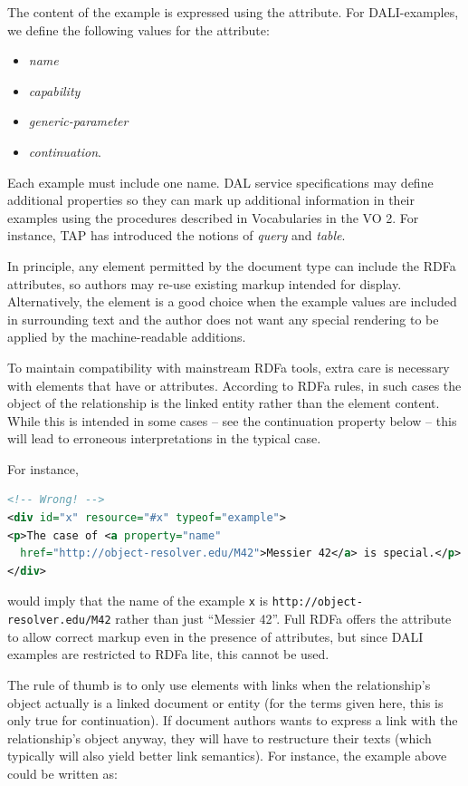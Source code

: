 \documentclass[11pt,letter]{ivoa}
\begin{document}
The content of the example is expressed using the  attribute. For
DALI-examples, we define the following values for the  attribute:

\begin{itemize}
\item \emph{name}
\item \emph{capability}
\item \emph{generic-parameter}
\item \emph{continuation}.
\end{itemize}

Each example must include one
name.  DAL service specifications may define additional
properties so they can mark up additional information in their examples
using the procedures described in Vocabularies in the VO 2.  For
instance, TAP has introduced the notions of \emph{query} and \emph{table}.

In principle, any element permitted by the document type can include the RDFa
attributes, so authors may re-use existing markup intended for display.
Alternatively, the  element is a good choice when the example values are
included in surrounding text and the author does not want any special rendering
to be applied by the machine-readable additions.

To maintain compatibility with mainstream RDFa tools, extra care is
necessary with elements that have  or 
attributes.  According to RDFa rules, in such cases the object of the
relationship is the linked entity rather than the element content.
While this is intended in some cases -- see the continuation property
below -- this will lead to erroneous interpretations in the typical
case.

For instance,

\begin{lstlisting}[language=XML]
<!-- Wrong! -->
<div id="x" resource="#x" typeof="example">
<p>The case of <a property="name"
  href="http://object-resolver.edu/M42">Messier 42</a> is special.</p>
</div>
\end{lstlisting}

\noindent
would imply that the name of the example \texttt{x} is
\nolinkurl{http://object-resolver.edu/M42} rather than just ``Messier
42''.  Full RDFa offers the  attribute to allow correct
markup even in the presence of  attributes, but since DALI
examples are restricted to RDFa lite, this cannot be used.

The rule of thumb is to only use elements with links when the
relationship's object actually is a linked document or entity (for the
terms given here, this is only true for continuation).  If document
authors wants to express a link with the relationship's object anyway,
they will have to restructure their texts (which typically will also
yield better link semantics).  For instance, the example above could be
written as:
\end{document}
